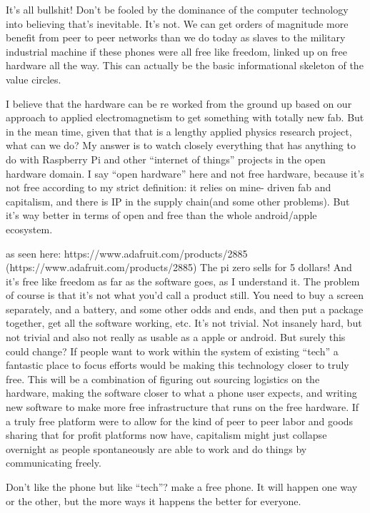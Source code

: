 It's all bullshit! Don't be fooled by the dominance of the computer
technology into believing that's inevitable. It's not. We can get orders
of magnitude more benefit from peer to peer networks than we do today as
slaves to the military industrial machine if these phones were all free
like freedom, linked up on free hardware all the way. This can actually
be the basic informational skeleton of the value circles.

I believe that the hardware can be re worked from the ground up based on
our approach to applied electromagnetism to get something with totally
new fab. But in the mean time, given that that is a lengthy applied
physics research project, what can we do? My answer is to watch closely
everything that has anything to do with Raspberry Pi and other
``internet of things'' projects in the open hardware domain. I say
``open hardware'' here and not free hardware, because it's not free
according to my strict definition: it relies on mine- driven fab and
capitalism, and there is IP in the supply chain(and some other
problems). But it's way better in terms of open and free than the whole
android/apple ecosystem.

as seen here: https://www.adafruit.com/products/2885
(https://www.adafruit.com/products/2885) The pi zero sells for 5
dollars! And it's free like freedom as far as the software goes, as I
understand it. The problem of course is that it's not what you'd call a
product still. You need to buy a screen separately, and a battery, and
some other odds and ends, and then put a package together, get all the
software working, etc. It's not trivial. Not insanely hard, but not
trivial and also not really as usable as a apple or android. But surely
this could change? If people want to work within the system of existing
``tech'' a fantastic place to focus efforts would be making this
technology closer to truly free. This will be a combination of figuring
out sourcing logistics on the hardware, making the software closer to
what a phone user expects, and writing new software to make more free
infrastructure that runs on the free hardware. If a truly free platform
were to allow for the kind of peer to peer labor and goods sharing that
for profit platforms now have, capitalism might just collapse overnight
as people spontaneously are able to work and do things by communicating
freely.

Don't like the phone but like ``tech''? make a free phone. It will
happen one way or the other, but the more ways it happens the better for
everyone.


